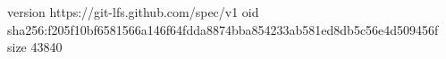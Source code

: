 version https://git-lfs.github.com/spec/v1
oid sha256:f205f10bf6581566a146f64fdda8874bba854233ab581ed8db5c56e4d509456f
size 43840
